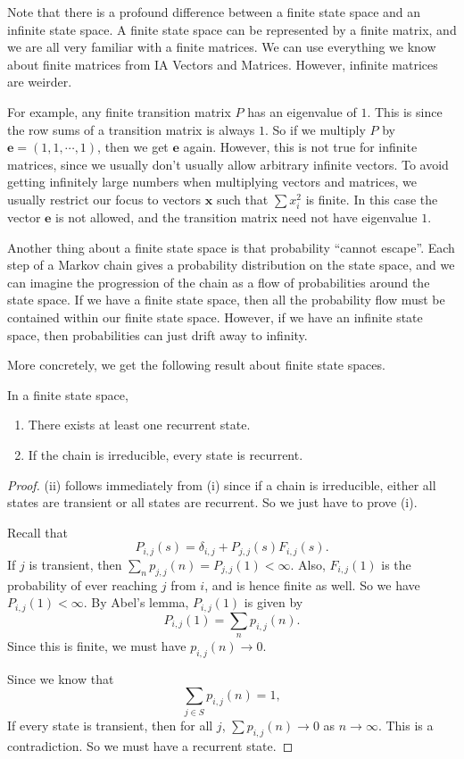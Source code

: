 \documentclass[a4paper]{article}
\begin{document}
Note that there is a profound difference between a finite state space and an infinite state space. A finite state space can be represented by a finite matrix, and we are all very familiar with a finite matrices. We can use everything we know about finite matrices from IA Vectors and Matrices. However, infinite matrices are weirder.

For example, any finite transition matrix $P$ has an eigenvalue of $1$. This is since the row sums of a transition matrix is always $1$. So if we multiply $P$ by $\mathbf{e} = (1, 1, \cdots, 1)$, then we get $\mathbf{e}$ again. However, this is not true for infinite matrices, since we usually don't usually allow arbitrary infinite vectors. To avoid getting infinitely large numbers when multiplying vectors and matrices, we usually restrict our focus to vectors $\mathbf{x}$ such that $\sum x_i^2$ is finite. In this case the vector $\mathbf{e}$ is not allowed, and the transition matrix need not have eigenvalue $1$.

Another thing about a finite state space is that probability ``cannot escape''. Each step of a Markov chain gives a probability distribution on the state space, and we can imagine the progression of the chain as a flow of probabilities around the state space. If we have a finite state space, then all the probability flow must be contained within our finite state space. However, if we have an infinite state space, then probabilities can just drift away to infinity.

More concretely, we get the following result about finite state spaces.
\begin{thm}
  In a finite state space,
  \begin{enumerate}
    \item There exists at least one recurrent state.
    \item If the chain is irreducible, every state is recurrent.
  \end{enumerate}
\end{thm}

\begin{proof}
  (ii) follows immediately from (i) since if a chain is irreducible, either all states are transient or all states are recurrent. So we just have to prove (i).

  Recall that
  \[
    P_{i, j}(s) = \delta_{i, j} + P_{j, j}(s) F_{i, j}(s).
  \]
  If $j$ is transient, then $\sum_n p_{j, j}(n) = P_{j, j}(1) < \infty$. Also, $F_{i, j}(1)$ is the probability of ever reaching $j$ from $i$, and is hence finite as well. So we have $P_{i, j}(1) < \infty$. By Abel's lemma, $P_{i, j}(1)$ is given by
  \[
    P_{i, j}(1) = \sum_n p_{i, j}(n).
  \]
  Since this is finite, we must have $p_{i, j}(n)\to 0$.

  Since we know that
  \[
    \sum_{j\in S}p_{i, j}(n) = 1,
  \]
  If every state is transient, then for all $j$, $\sum p_{i, j}(n) \to 0$ as $n\to \infty$. This is a contradiction. So we must have a recurrent state.
\end{proof}
\end{document}

